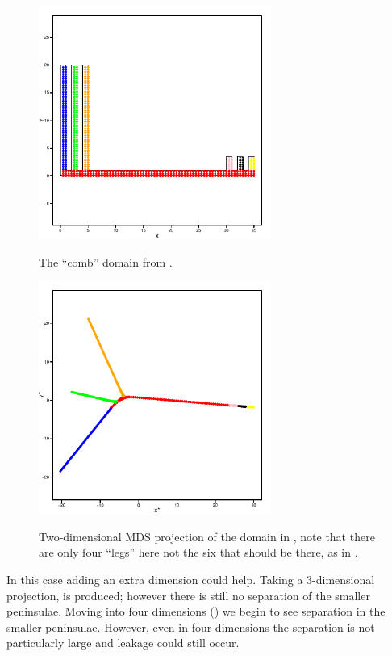 {\begin{figure}
\centering
\includegraphics[width=3in]{mds/figs/comb.pdf} \\
\caption{The ``comb'' domain from .}
\label{mds-comb}
\end{figure}

\begin{figure}
\centering
\includegraphics[width=3in]{mds/figs/comb-2d.pdf} \\
\caption{Two-dimensional MDS projection of the domain in , note that there are only four ``legs'' here not the six that should be there, as in .}
\label{mds-comb-2d}
\end{figure}

In this case adding an extra dimension could help. Taking a 3-dimensional projection,  is produced; however there is still no separation of the smaller peninsulae. Moving into four dimensions () we begin to see separation in the smaller peninsulae. However, even in four dimensions the separation is not particularly large and leakage could still occur.

}
